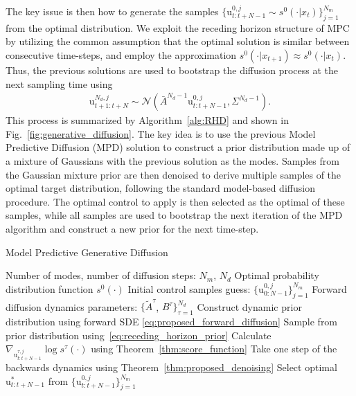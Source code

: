 \documentclass[letterpaper, 10 pt, conference]{IEEEconf}
\begin{document}
The key issue is then how to generate the samples $\{\mathrm{u}_{t:t+N-1}^{0, j} \sim s^{0}(\cdot | x_{t})\}_{j=1}^{N_m}$ from the optimal distribution.
We exploit the receding horizon structure of MPC by utilizing the common assumption that the optimal solution is similar between consecutive time-steps, and employ the approximation $s^{0}(\cdot | x_{t+1}) \approx s^{0}(\cdot | x_{t})$.
Thus, the previous solutions are used to bootstrap the diffusion process at the next sampling time using 
\begin{align} \label{eq:receding_horizon_prior}
    \mathrm{u}_{t+1:t+N}^{N_d, j} \sim \mathcal{N}(\bar{A}^{N_d-1} \mathrm{u}_{t:t+N-1}^{0, j}, \Sigma^{N_d-1}).
\end{align}
This process is summarized by Algorithm~\ref{alg:RHD} and shown in Fig.~\ref{fig:generative_diffusion}.
The key idea is to use the previous Model Predictive Diffusion (MPD) solution to construct a prior distribution made up of a mixture of Gaussians with the previous solution as the modes.
Samples from the Gaussian mixture prior are then denoised to derive multiple samples of the optimal target distribution, following the standard model-based diffusion procedure.
The optimal control to apply is then selected as the optimal of these samples, while all samples are used to bootstrap the next iteration of the MPD algorithm and construct a new prior for the next time-step.

\begin{algorithm}[h]
\footnotesize
\caption{Model Predictive Generative Diffusion}
\label{alg:RHD}
\begin{algorithmic}[1]
\Require Number of modes, number of diffusion steps: $N_m$, $N_d$
\Require Optimal probability distribution function $s^{0}(\cdot)$
\Require Initial control samples guess: $\{\mathrm{u}^{0, j}_{0:N-1}\}_{j=1}^{N_m}$
\Require Forward diffusion dynamics parameters: $\{\tilde{A}^{\tau}$, $B^{\tau} \}_{\tau=1}^{N_d}$
        \State Construct dynamic prior distribution using forward SDE \eqref{eq:proposed_forward_diffusion}
        \State Sample from prior distribution using~\eqref{eq:receding_horizon_prior} %
            \State Calculate $\nabla_{\mathrm{u}_{t:t+N-1}^{\tau, j}} \log{s^{\tau}(\cdot)}$ using Theorem~\ref{thm:score_function} %
            \State Take one step of the backwards dynamics using Theorem~\ref{thm:proposed_denoising} %
        \EndFor
    \EndFor
    \State Select optimal $\mathrm{u}_{t:t+N-1}^{\ast}$ from $\{\mathrm{u}_{t:t+N-1}^{0, j} \}_{j=1}^{N_m}$
\EndFor
\end{algorithmic}
\end{algorithm}
\end{document}
